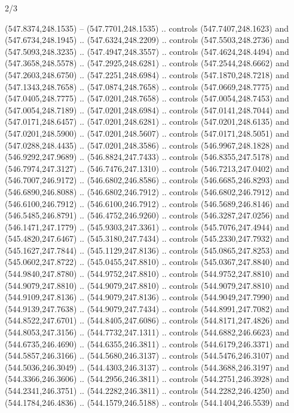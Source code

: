 \begin{flagdescription}{2/3}
\begin{scope}[xshift=0.5\flaglength,yshift=0.5\flagwidth,scale=\flagwidth/495.65]
\begin{scope}[y=0.8pt, x=0.8pt, yscale=-1,shift={(-463.76,-309.78)}]
  (547.8374,248.1535) -- (547.7701,248.1535) .. controls (547.7407,248.1623) and
  (547.6734,248.1945) .. (547.6324,248.2209) .. controls (547.5503,248.2736) and
  (547.5093,248.3235) .. (547.4947,248.3557) .. controls (547.4624,248.4494) and
  (547.3658,248.5578) .. (547.2925,248.6281) .. controls (547.2544,248.6662) and
  (547.2603,248.6750) .. (547.2251,248.6984) .. controls (547.1870,248.7218) and
  (547.1343,248.7658) .. (547.0874,248.7658) .. controls (547.0669,248.7775) and
  (547.0405,248.7775) .. (547.0201,248.7658) .. controls (547.0054,248.7453) and
  (547.0054,248.7189) .. (547.0201,248.6984) .. controls (547.0141,248.7044) and
  (547.0171,248.6457) .. (547.0201,248.6281) .. controls (547.0201,248.6135) and
  (547.0201,248.5900) .. (547.0201,248.5607) .. controls (547.0171,248.5051) and
  (547.0288,248.4435) .. (547.0201,248.3586) .. controls (546.9967,248.1828) and
  (546.9292,247.9689) .. (546.8824,247.7433) .. controls (546.8355,247.5178) and
  (546.7974,247.3127) .. (546.7476,247.1310) .. controls (546.7213,247.0402) and
  (546.7007,246.9172) .. (546.6802,246.8586) .. controls (546.6685,246.8293) and
  (546.6890,246.8088) .. (546.6802,246.7912) .. controls (546.6802,246.7912) and
  (546.6100,246.7912) .. (546.6100,246.7912) .. controls (546.5689,246.8146) and
  (546.5485,246.8791) .. (546.4752,246.9260) .. controls (546.3287,247.0256) and
  (546.1471,247.1779) .. (545.9303,247.3361) .. controls (545.7076,247.4944) and
  (545.4820,247.6467) .. (545.3180,247.7434) .. controls (545.2330,247.7932) and
  (545.1627,247.7844) .. (545.1129,247.8136) .. controls (545.0865,247.8253) and
  (545.0602,247.8722) .. (545.0455,247.8810) .. controls (545.0367,247.8840) and
  (544.9840,247.8780) .. (544.9752,247.8810) .. controls (544.9752,247.8810) and
  (544.9079,247.8810) .. (544.9079,247.8810) .. controls (544.9079,247.8810) and
  (544.9109,247.8136) .. (544.9079,247.8136) .. controls (544.9049,247.7990) and
  (544.9139,247.7638) .. (544.9079,247.7434) .. controls (544.8991,247.7082) and
  (544.8522,247.6701) .. (544.8405,247.6086) .. controls (544.8171,247.4826) and
  (544.8053,247.3156) .. (544.7732,247.1311) .. controls (544.6882,246.6623) and
  (544.6735,246.4690) .. (544.6355,246.3811) .. controls (544.6179,246.3371) and
  (544.5857,246.3166) .. (544.5680,246.3137) .. controls (544.5476,246.3107) and
  (544.5036,246.3049) .. (544.4303,246.3137) .. controls (544.3688,246.3197) and
  (544.3366,246.3606) .. (544.2956,246.3811) .. controls (544.2751,246.3928) and
  (544.2341,246.3751) .. (544.2282,246.3811) .. controls (544.2282,246.4250) and
  (544.1784,246.4836) .. (544.1579,246.5188) .. controls (544.1404,246.5539) and

\end{scope}
\end{scope}
\end{flagdescription}
